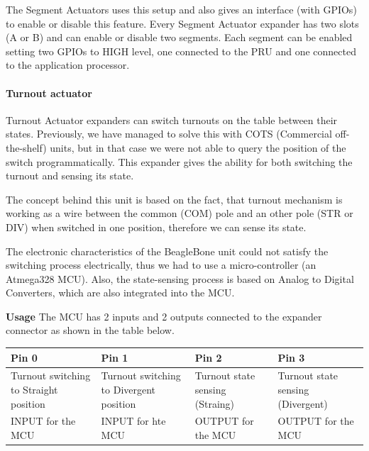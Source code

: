 The Segment Actuators uses this setup and also gives an interface (with GPIOs) to enable or disable this feature. Every Segment Actuator expander has two slots (A or B) and can enable or disable two segments. Each segment can be enabled setting two GPIOs to HIGH level, one connected to the PRU and one connected to the application processor.

\paragraph{Turnout actuator}
Turnout Actuator expanders can switch turnouts on the table between their states. Previously, we have managed to solve this with COTS (Commercial off-the-shelf) units, but in that case we were not able to query the position of the switch programmatically. This expander gives the ability for both switching the turnout and sensing its state.

The concept behind this unit is based on the fact, that turnout mechanism is working as a wire between the common (COM) pole and an other pole (STR or DIV) when switched in one position, therefore we can sense its state.

The electronic characteristics of the BeagleBone unit could not satisfy the switching process electrically, thus we had to use a micro-controller (an Atmega328 MCU). Also, the state-sensing process is based on Analog to Digital Converters, which are also integrated into the MCU.

\textbf{Usage}
The MCU has 2 inputs and 2 outputs connected to the expander connector as shown in the table below.
\begin{center}
	\renewcommand{\arraystretch}{1.5}
	\begin{tabu} to 1.0\textwidth {X[c] X[c] X[c] X[c]}
		\toprule
		Pin 0                                  & Pin 1                                   & Pin 2                           & Pin 3                             \\ \midrule
		Turnout switching to Straight position & Turnout switching to Divergent position & Turnout state sensing (Straing) & Turnout state sensing (Divergent) \\
		INPUT for the MCU                      & INPUT for hte MCU                       & OUTPUT for the MCU              & OUTPUT for the MCU                \\ \bottomrule
	\end{tabu}
\end{center}


